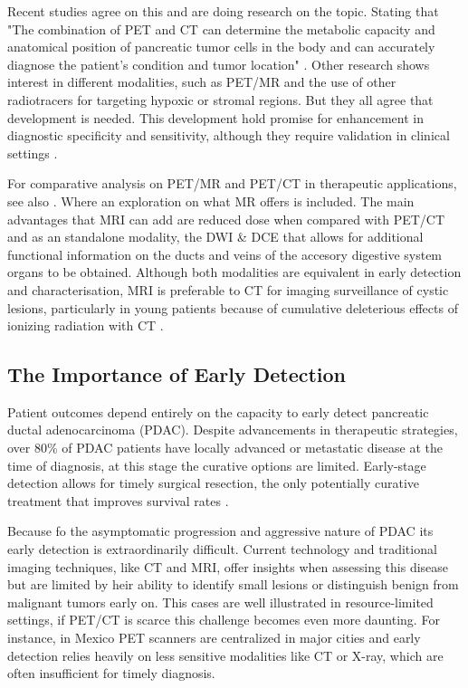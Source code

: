 Recent studies agree on this and are doing research on the topic. Stating that "The combination of PET and CT can determine the metabolic capacity and anatomical position of pancreatic tumor cells in the body and can accurately diagnose the patient's condition and tumor location" \cite{Pu2021}. Other research shows interest in different modalities, such as PET/MR and the use of other radiotracers for targeting hypoxic or stromal regions. But they all agree that development is needed. This development hold promise for enhancement in diagnostic specificity and sensitivity, although they require validation in clinical settings \cite{Cancers2023}. 


For comparative analysis on PET/MR and PET/CT in therapeutic applications, see also \cite{myownotherpaper}. Where an exploration on what MR offers is included. The main advantages that MRI can add are reduced dose when compared with PET/CT and as an standalone modality, the DWI \& DCE that allows for additional functional information on the ducts and veins of the accesory digestive system organs to be obtained.  
Although both modalities are equivalent in early detection and characterisation, MRI is preferable to CT for imaging surveillance of cystic lesions, particularly in young patients because of cumulative deleterious effects of ionizing radiation with CT \cite{Cancers2023}.


\subsection{The Importance of Early Detection}

Patient outcomes depend entirely on the capacity to early detect pancreatic ductal adenocarcinoma (PDAC). Despite advancements in therapeutic strategies, over 80\% of PDAC patients have locally advanced or metastatic disease at the time of diagnosis, at this stage the curative options are limited. Early-stage detection allows for timely surgical resection, the only potentially curative treatment that improves survival rates \cite{Cancers2023}. 

Because fo the asymptomatic progression and aggressive nature of PDAC its early detection is extraordinarily difficult. Current technology and traditional imaging techniques, like CT and MRI, offer insights when assessing this disease but are limited by heir ability to identify small lesions or distinguish benign from malignant tumors early on. This cases are well illustrated in resource-limited settings, if PET/CT is scarce this challenge becomes even more daunting. For instance, in Mexico PET scanners are centralized in major cities and early detection relies heavily on less sensitive modalities like CT or X-ray, which are often insufficient for timely diagnosis.

